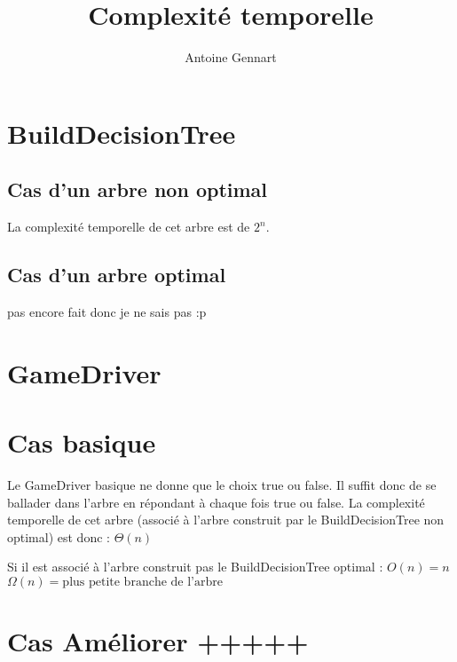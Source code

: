 \documentclass[10pt,a4paper]{article}
\author{Antoine Gennart}
\title{Complexité temporelle}
\begin{document}
\maketitle

\section{BuildDecisionTree}

\subsection{Cas d'un arbre non optimal}
La complexité temporelle de cet arbre est de $2^n$.

\subsection{Cas d'un arbre optimal}
pas encore fait donc je ne sais pas :p



\section{GameDriver}
\section{Cas basique}
Le GameDriver basique ne donne que le choix true ou false. Il suffit donc de se ballader dans l'arbre en répondant à chaque fois true ou false. 
La complexité temporelle de cet arbre (associé à l'arbre construit par le BuildDecisionTree non optimal) est donc : $\Theta(n)$

Si il est associé à l'arbre construit pas le BuildDecisionTree optimal :
$ O(n) = n $
$ \Omega(n) = \text{plus petite branche de l'arbre} $
\section{Cas Améliorer +++++}
\end{document}
